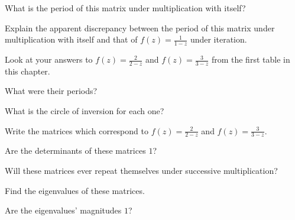 \documentclass[../key.tex]{subfiles}
\begin{document}
\begin{inner_problem}
\item What is the period of this matrix under multiplication with itself?
\end{inner_problem}

\begin{inner_problem}
\item Explain the apparent discrepancy between the period of this matrix under multiplication with itself and that of $f(z)=\frac{1}{1-z}$ under iteration.
\end{inner_problem}

\begin{outer_problem}
\item Look at your answers to $f(z)=\frac{2}{2-z}$ and $f(z)=\frac{3}{3-z}$ from the first table in this chapter.
\end{outer_problem}

\begin{inner_problem}[start=1]
\item What were their periods?
\end{inner_problem}

\begin{inner_problem}
\item What is the circle of inversion for each one?
\end{inner_problem}

\begin{inner_problem}
\item Write the matrices which correspond to $f(z)=\frac{2}{2-z}$ and $f(z)=\frac{3}{3-z}$.
\end{inner_problem}

\begin{inner_problem}
\item Are the determinants of these matrices $1$?
\end{inner_problem}

\begin{inner_problem}
\item Will these matrices ever repeat themselves under successive multiplication?
\end{inner_problem}

\begin{inner_problem}
\item Find the eigenvalues of these matrices.
\end{inner_problem}

\begin{inner_problem}
\item Are the eigenvalues' magnitudes $1$?
\end{inner_problem}
\end{document}
